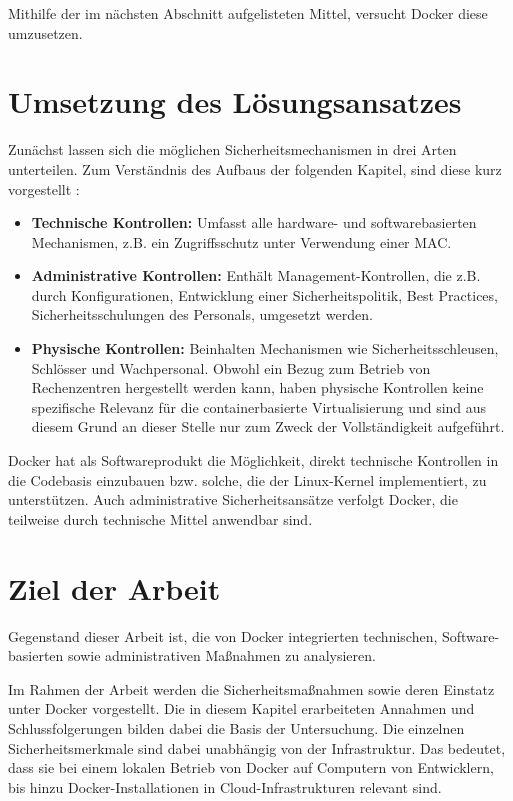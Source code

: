 \documentclass[../main.tex]{subfiles}
\begin{document}
    Mithilfe der im nächsten Abschnitt aufgelisteten Mittel, versucht Docker diese umzusetzen.


  \section{Umsetzung des Lösungsansatzes} %
    Zunächst lassen sich die möglichen Sicherheitsmechanismen in drei Arten unterteilen. Zum Verständnis des Aufbaus der folgenden Kapitel, sind diese kurz vorgestellt \cite[S.40]{CISSP}:

    \begin{itemize}
      \item \textbf{Technische Kontrollen:} Umfasst alle hardware- und softwarebasierten Mechanismen, z.B. ein Zugriffsschutz unter Verwendung einer MAC.
      \item \textbf{Administrative Kontrollen:} Enthält Management-Kontrollen, die z.B. durch Konfigurationen, Entwicklung einer Sicherheitspolitik, Best Practices, Sicherheitsschulungen des Personals, umgesetzt werden.
      \item \textbf{Physische Kontrollen:} Beinhalten Mechanismen wie Sicherheitsschleusen, Schlösser und Wachpersonal. Obwohl ein Bezug zum Betrieb von Rechenzentren hergestellt werden kann, haben physische Kontrollen keine spezifische Relevanz für die containerbasierte Virtualisierung und sind aus diesem Grund an dieser Stelle nur zum Zweck der Vollständigkeit aufgeführt.
    \end{itemize}

    Docker hat als Softwareprodukt die Möglichkeit, direkt technische Kontrollen in die Codebasis einzubauen bzw. solche, die der Linux-Kernel implementiert, zu unterstützen. Auch administrative Sicherheitsansätze verfolgt Docker, die teilweise durch technische Mittel anwendbar sind.

  \section{Ziel der Arbeit}
    Gegenstand dieser Arbeit ist, die von Docker integrierten technischen, Software-basierten sowie administrativen Maßnahmen zu analysieren.

    Im Rahmen der Arbeit werden die Sicherheitsmaßnahmen sowie deren Einstatz unter Docker vorgestellt. Die in diesem Kapitel erarbeiteten Annahmen und Schlussfolgerungen bilden dabei die Basis der Untersuchung. Die einzelnen Sicherheitsmerkmale sind dabei unabhängig von der Infrastruktur. Das bedeutet, dass sie bei einem lokalen Betrieb von Docker auf Computern von Entwicklern, bis hinzu Docker-Installationen in Cloud-Infrastrukturen relevant sind.
\end{document}

